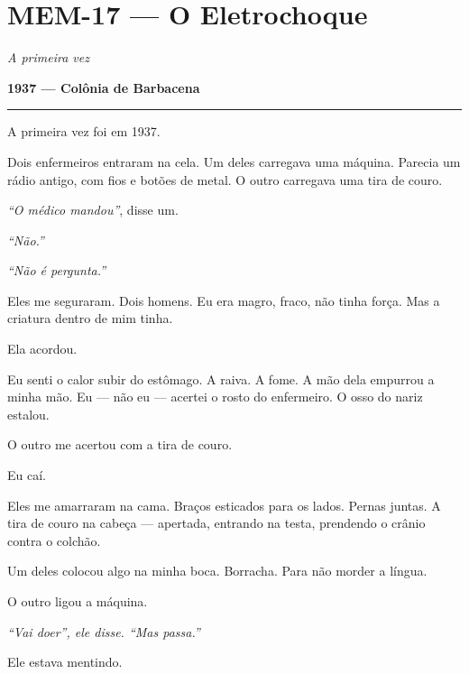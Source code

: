 \section*{\textbf{MEM-17} --- O Eletrochoque}

\noindent \textit{A primeira vez}

\noindent \textbf{1937 --- Colônia de Barbacena}

\vspace{0.5em}\noindent\rule{\textwidth}{0.5pt}\vspace{0.5em}

\noindent A primeira vez foi em 1937.

\noindent Dois enfermeiros entraram na cela. Um deles carregava uma máquina. Parecia um rádio antigo, com fios e botões de metal. O outro carregava uma tira de couro.

\noindent \textit{\textquotedblleft{}O médico mandou\textquotedblright{}}, disse um.

\noindent \textit{\textquotedblleft{}Não.\textquotedblright{}}

\noindent \textit{\textquotedblleft{}Não é pergunta.\textquotedblright{}}

\noindent Eles me seguraram. Dois homens. Eu era magro, fraco, não tinha força. Mas a criatura dentro de mim tinha.

\noindent Ela acordou.

\noindent Eu senti o calor subir do estômago. A raiva. A fome. A mão dela empurrou a minha mão. Eu --- não eu --- acertei o rosto do enfermeiro. O osso do nariz estalou.

\noindent O outro me acertou com a tira de couro.

\noindent Eu caí.

\noindent Eles me amarraram na cama. Braços esticados para os lados. Pernas juntas. A tira de couro na cabeça --- apertada, entrando na testa, prendendo o crânio contra o colchão.

\noindent Um deles colocou algo na minha boca. Borracha. Para não morder a língua.

\noindent O outro ligou a máquina.

\noindent \textit{\textquotedblleft{}Vai doer\textquotedblright{}\textit{, ele disse. }\textquotedblleft{}Mas passa.\textquotedblright{}}

\noindent Ele estava mentindo.

